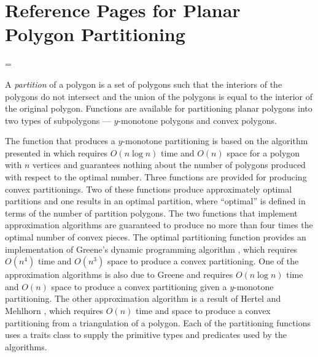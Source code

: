 
\clearpage
\section{Reference Pages for Planar Polygon Partitioning}

\begin{ccTexOnly}
\ifnum\ccNewRefManualStyle=\ccTrue
\end{ccTexOnly}
A {\em partition} of a polygon is a set 
of polygons such that the interiors of the polygons do not intersect and 
the union of the polygons is equal to the interior of the original polygon.
Functions are available for partitioning planar polygons into two 
types of subpolygons --- $y$-monotone polygons and convex polygons.  

The function that produces a $y$-monotone partitioning is based on the 
algorithm presented in \cite{bkos-cgaa-97} which requires $O(n \log n)$ time 
and $O(n)$ space for a polygon with $n$ vertices and guarantees nothing 
about the number of polygons produced with respect to the optimal number.
Three functions are provided for producing
convex partitionings. Two of these functions produce approximately optimal 
partitions and one results in an optimal partition, where ``optimal'' is
defined in terms of the number of partition polygons.   The two functions
that implement approximation algorithms are guaranteed to produce no more 
than four times the optimal number of convex pieces.  The optimal partitioning
function provides an implementation of Greene's dynamic programming algorithm
\cite{g-dpcp-83}, which requires $O(n^4)$ time and $O(n^3)$ space to produce a 
convex partitioning. One of the approximation algorithms is also due to 
Greene \cite{g-dpcp-83} and requires $O(n \log n)$ time and $O(n)$ space
to produce a convex partitioning given a $y$-monotone partitioning.  The
other approximation algorithm is a result of Hertel and
Mehlhorn \cite{hm-ftsp-83}, which requires $O(n)$ time and space to produce
a convex partitioning from a triangulation of a polygon.
Each of the partitioning functions uses a traits class to supply the
primitive types and predicates used by the algorithms.
\begin{ccTexOnly}
\fi
\end{ccTexOnly}

